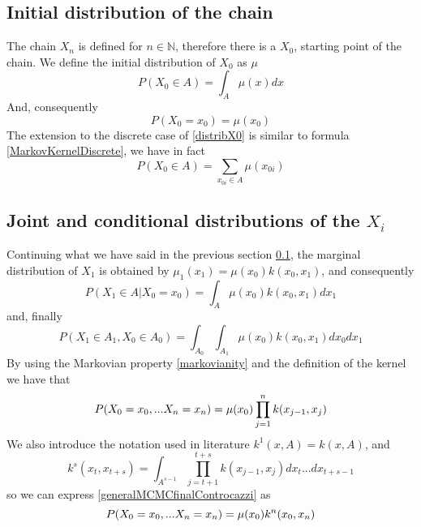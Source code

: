 \documentclass[12pt,mythesisstyle]{report}
\begin{document}
\subsection{Initial distribution of the chain}\label{subsectionX0distrib}
The chain $X_n$ is defined for $n \in \mathbb{N}$, therefore there is a $X_0$, starting point of the chain. We define the initial distribution of $X_0$ as $\mu$
\begin{equation}\label{distribX0}
P(X_0 \in A)=\int_A \mu(x) dx
\end{equation}
And, consequently
\begin{equation}
P(X_0=x_0)=\mu(x_0)
\end{equation}
The extension to the discrete case of \eqref{distribX0} is similar to formula \eqref{MarkovKernelDiscrete}, we have in fact
\begin{equation}\label{distribX0discrete}
P(X_0 \in A)=\sum_{x_{0i} \in A } \mu(x_{0i}) 
\end{equation}


\subsection{Joint and conditional distributions of the $X_i$}
Continuing what we have said in the previous section \ref{subsectionX0distrib}, the marginal distribution of $X_1$ is obtained by  $\mu_1(x_1)=\mu(x_0)k(x_0,x_1)$, and consequently \cite{RobertCasella} 
\begin{equation}
P(X_1 \in A|X_0=x_0)=\int_A \mu(x_0)k(x_0,x_1) dx_1
\end{equation}
and, finally
\begin{equation}
P(X_1 \in A_1, X_0 \in A_0)=\int_{A_0} \int_{A_1} \mu(x_0)k(x_0,x_1) dx_0dx_1
\end{equation}
By using the Markovian property \eqref{markovianity} and the definition of the kernel we have that \cite{mcmcnotes}
\begin{equation}\label{generalMCMCfinalControcazzi} 
P(X_0=x_0,...X_n=x_n)= \\
\mu(x_0)\prod_{j=1}^{n}k(x_{j-1},x_j)
\end{equation}
We also introduce the notation used in literature \cite{RobertCasella} \cite{mcmcnotes} $k^1(x,A)=k(x,A)$, and
\begin{equation}\label{kernelN}
k^s(x_t,x_{t+s})=\int_{A^{s-1}} \prod_{j=t+1}^{t+s} k(x_{j-1},x_j)dx_t...dx_{t+s-1}
\end{equation}
so we can express \eqref{generalMCMCfinalControcazzi} as
\begin{equation}\label{generalMCMCfinalControcazziEconkenne}
P(X_0=x_0,...X_n=x_n)= \\
\mu(x_0)k^n(x_{0},x_n)
\end{equation}
\end{document}
